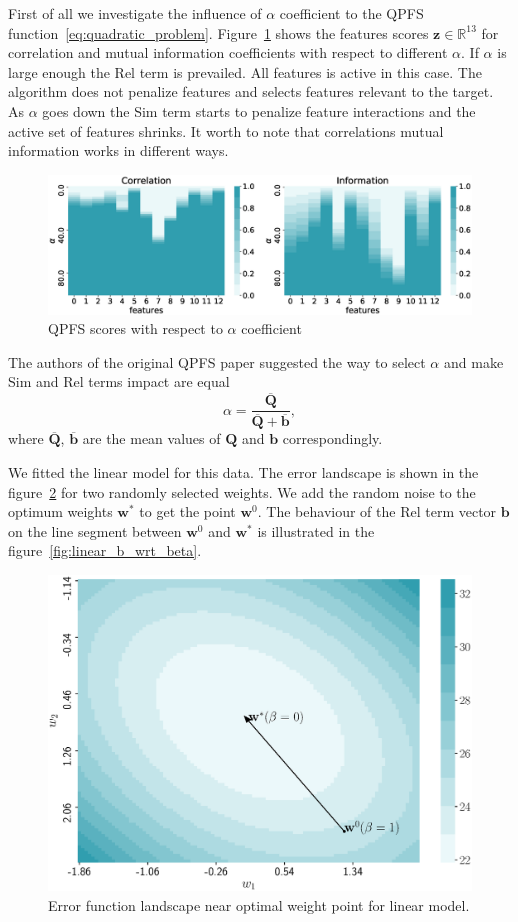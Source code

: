 \documentclass[a4paper,12pt]{article}
\theoremstyle{plain} %
\theoremstyle{definition} %
\theoremstyle{remark} %
\newcommand{\bb}{\mathbf{b}}
\newcommand{\bw}{\mathbf{w}}
\newcommand{\bz}{\mathbf{z}}
\newcommand{\bQ}{\mathbf{Q}}
\newcommand{\bbR}{\mathbb{R}}
\begin{document}
  	First of all we investigate the influence of $\alpha$ coefficient to the QPFS function~\ref{eq:quadratic_problem}. Figure~\ref{fig:qpfs_corr_vs_info_wrt_alpha} shows the features scores $\bz \in \bbR^{13}$ for correlation and mutual information coefficients with respect to different $\alpha$. If $\alpha$ is large enough the Rel term is prevailed. All features is active in this case. The algorithm does not penalize features and selects features relevant to the target. As $\alpha$ goes down the Sim term starts to penalize feature interactions and the active set of features shrinks. It worth to note that correlations mutual information works in different ways.
  	
  	\begin{figure}[h]
  		\includegraphics[width=\linewidth]{figs/qpfs_corr_vs_info_wrt_alpha.eps}
  		\caption{QPFS scores with respect to $\alpha$ coefficient}
  		\label{fig:qpfs_corr_vs_info_wrt_alpha}
  	\end{figure}
  
  The authors of the original QPFS paper suggested the way to select $\alpha$ and make Sim and Rel terms impact are equal
  \[
  	\alpha = \frac{\overline{\bQ}}{\overline{\bQ} + \overline{\bb}},
  \] 
  where $\overline{\bQ}$, $\overline{\bb}$ are the mean values of $\bQ$ and $\bb$ correspondingly.
  
  We fitted the linear model for this data.
  The error landscape is shown in the figure~\ref{fig:linear_error} for two randomly selected weights. 
  We add the random noise to the optimum weights $\bw^*$ to get the point $\bw^0$. The behaviour of the Rel term vector $\bb$ on the line segment between $\bw^0$ and $\bw^*$ is illustrated in the figure~\ref{fig:linear_b_wrt_beta}.

	\begin{figure}[!h]	
		\centering
		\includegraphics[width=0.8\linewidth]{figs/linear_error.eps}	 
		\caption{Error function landscape near optimal weight point for linear model.}
		\label{fig:linear_error}
	\end{figure}
\end{document}
